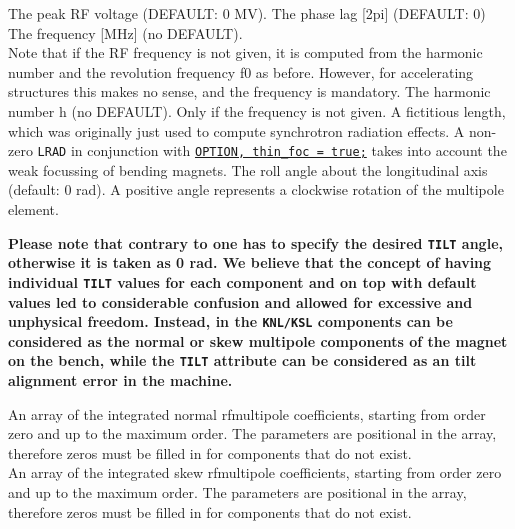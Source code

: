 \begin{madlist}
    The peak RF voltage (DEFAULT: 0 MV).  
    The phase lag [2pi] (DEFAULT: 0) 
    The frequency [MHz] (no DEFAULT). \\ 
     Note that if the RF
     frequency is not given, it is computed from the harmonic
     number and the revolution frequency f0 as before. However, for
     accelerating structures this makes no sense, and the frequency
     is mandatory.  
    The harmonic number h (no DEFAULT). Only if the
     frequency is not given. 
    A fictitious length, which was originally just used to
     compute synchrotron radiation effects. A non-zero {\tt LRAD} in
     conjunction with \hyperref[sec:option]{\tt OPTION, thin\_foc = true;} 
     takes into account the weak focussing of bending magnets.  
    The roll angle about the longitudinal axis (default: 0
     rad). A positive angle represents a clockwise rotation of the
     multipole element.            

     \textbf{Please note that contrary to \madeight one has to specify the
       desired {\tt TILT} angle, otherwise it is taken as 0 rad. We
       believe that the \madeight concept of having individual {\tt TILT}
       values for each component and on top with default values
       led to considerable confusion and allowed for excessive
       and unphysical freedom. Instead, in \madx the {\tt KNL/KSL}
       components can be considered as the normal or skew
       multipole components of the magnet on the bench, while the
       {\tt TILT} attribute can be considered as an tilt alignment
       error in the machine.} 

    An array of the integrated normal rfmultipole
     coefficients, starting from order zero and up to the maximum
     order. The parameters are positional in the array, therefore zeros
     must be filled in for components that do not exist. \\ 
    An array of the integrated skew rfmultipole
     coefficients, starting from order zero and up to the maximum
     order. The parameters are positional in the array, therefore zeros
     must be filled in for components that do not exist.\\ 


\end{madlist}
